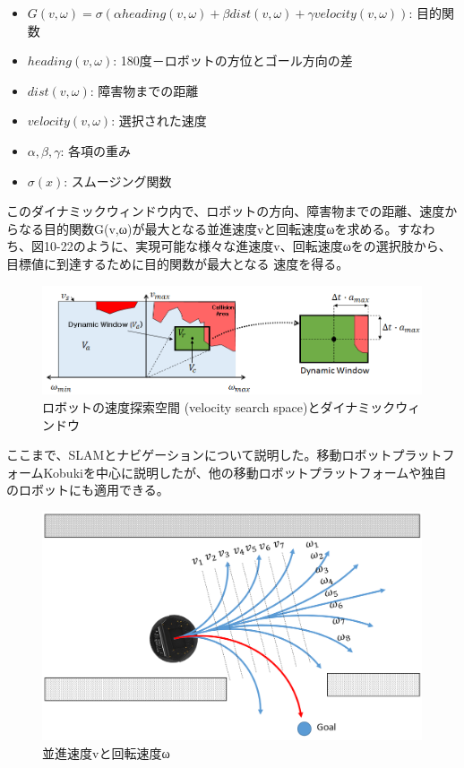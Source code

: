 \begin{itemize}
\item  $G(v,\omega) = \sigma(\alpha heading(v,\omega) + \beta dist(v,\omega) + \gamma velocity(v,\omega))$: 目的関数
\item $heading(v,\omega)$: 180度－ロボットの方位とゴール方向の差
\item $dist(v,\omega)$: 障害物までの距離
\item $velocity(v,\omega)$: 選択された速度
\item $\alpha, \beta, \gamma$: 各項の重み
\item $\sigma(x)$: スムージング関数
\end{itemize}

このダイナミックウィンドウ内で、ロボットの方向、障害物までの距離、速度からなる目的関数G(v,ω)が最大となる並進速度vと回転速度ωを求める。すなわち、図10-22のように、実現可能な様々な進速度v、回転速度ωをの選択肢から、目標値に到達するために目的関数が最大となる  速度を得る。

\begin{figure}[htp]
  \centering
  \includegraphics[width=12cm]{pictures/chapter10/pic_10_21.png}
  \caption{ロボットの速度探索空間 (velocity search space)とダイナミックウィンドウ}
\end{figure}

ここまで、SLAMとナビゲーションについて説明した。移動ロボットプラットフォームKobukiを中心に説明したが、他の移動ロボットプラットフォームや独自のロボットにも適用できる。

\begin{figure}[htp]
  \centering
  \includegraphics[width=12cm]{pictures/chapter10/pic_10_22.png}
  \caption{並進速度vと回転速度ω}
\end{figure}

